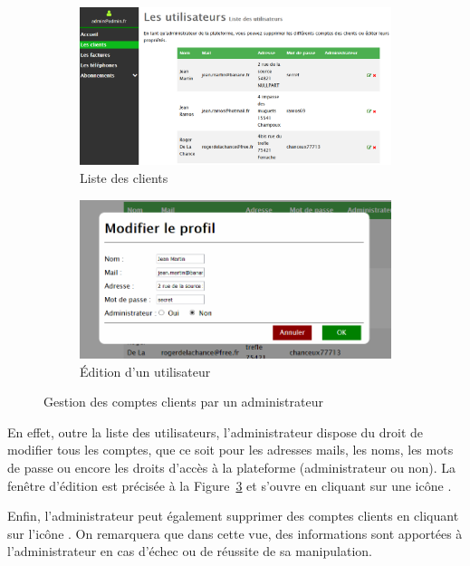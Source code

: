 \begin{figure}[ht]
  \centering
  \begin{subfigure}{.6\textwidth}
    \centering
    \includegraphics[width=.95\textwidth]{images/Plateforme/liste_utilisateurs}
    \caption{Liste des clients}
    \label{fig:listeusers}
  \end{subfigure}\hfill%
  \begin{subfigure}{.39\textwidth}
    \centering
    \includegraphics[width=.95\textwidth]{images/Plateforme/vue_edition_clients}
    \caption{\'Edition d'un utilisateur}
    \label{fig:editionuser}
  \end{subfigure}
  \caption{Gestion des comptes clients par un administrateur}
\end{figure}

En effet, outre la liste des utilisateurs, l'administrateur dispose du droit de modifier tous les comptes, que ce soit pour les adresses mails, les noms, les mots de passe ou encore les droits d'accès à la plateforme (administrateur ou non). La fenêtre d'édition est précisée à la Figure~\ref{fig:editionuser} et s'ouvre en cliquant sur une icône \vColor{\faEdit}.

Enfin, l'administrateur peut également supprimer des comptes clients en cliquant sur l'icône \thColor{\faRemove}. On remarquera que dans cette vue, des informations sont apportées à l'administrateur en cas d'échec ou de réussite de sa manipulation.

